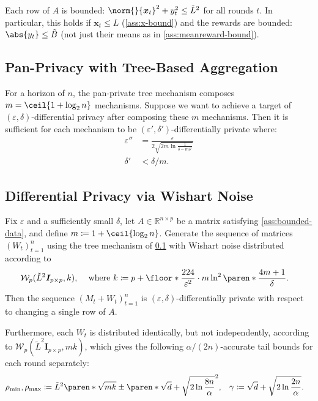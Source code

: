 \documentclass{article}
\renewcommand{\vec}[1]{\bm{#1}}
\newcommand{\defeq}{\coloneq}
\newcommand{\Real}{\mathds{R}}
\DeclarePairedDelimiter{\abs}||
\DeclarePairedDelimiter{\paren}()
\DeclarePairedDelimiter{\floor}\lfloor\rfloor
\DeclarePairedDelimiter{\ceil}\lceil\rceil
\newcommand{\Wishart}{\mathcal{W}}
\newcommand{\Eye}[1]{\bm{I}_{#1 \times #1}}
\begin{document}
\begin{assumption}\label{ass:bounded-data}
  Each row of $A$ is bounded:
  $\norm{}{\vec x_t}^2 + y_t^2 \le \tilde L^2$ for all rounds $t$.  In
  particular, this holds if $\vec x_t \le L$ (\cref{ass:x-bound}) and
  the rewards are bounded: $\abs{y_t} \le \tilde B$ (not just their
  means as in \cref{ass:meanreward-bound}).
\end{assumption}

\subsection{Pan-Privacy with Tree-Based Aggregation}
\label{sec:tree-mechanism}

  For a horizon
of $n$, the pan-private tree mechanism composes $m = \ceil{1+\log_2n}$
mechanisms.  Suppose we want to achieve a target of
$(\varepsilon,\delta)$-differential privacy after composing these $m$
mechanisms.  Then it is sufficient for each mechanism to be
$(\varepsilon',\delta')$-differentially private where:
\begin{align*}
  \varepsilon'' &= \frac{\varepsilon}{2\sqrt{2m\ln\frac{1}{\delta - m\delta'}}} \\
  \delta' &< \delta/m.
\end{align*}

\subsection{Differential Privacy via Wishart Noise}
\label{sec:dp-wishart}

\begin{theorem}%
  \label{thm:wishart-cont-dp}
  Fix $\varepsilon$ and a sufficiently small $\delta$, let
  $A\in\Real^{n\times p}$ be a matrix satisfying
  \cref{ass:bounded-data}, and define $m \defeq 1 + \ceil{\log_2n}$.
  Generate the sequence of matrices $(W_t)_{t=1}^n$ using the tree
  mechanism of \cref{sec:tree-mechanism} with Wishart noise distributed
  according to 
  \begin{align*}
    &\Wishart_p(\tilde L^2\Eye{p}, k),
    &\text{ where } k
    &\defeq p + \floor*{\frac{224}{\varepsilon^2} \cdot m\ln^2\paren*{\frac{4m+1}{\delta}}}.
  \end{align*}
  Then the sequence $(M_t + W_t)_{t=1}^n$ is
  $(\varepsilon,\delta)$-differentially private with respect to
  changing a single row of $A$.

  Furthermore, each $W_t$ is distributed identically, but not
  independently, according to $\Wishart_p(\tilde L^2\Eye{p}, mk)$, which
  gives the following $\alpha/(2n)$-accurate tail bounds for each
  round separately:
  \begin{align*}
    \rho_{\min}, \rho_{\max} &\defeq \tilde L^2 \paren*{\sqrt{mk}
                             \pm \paren*{\sqrt{d} + \sqrt{2\ln\frac{8n}{\alpha}}}}^2,
    &\gamma &\defeq \sqrt{d} + \sqrt{2\ln\frac{2n}{\alpha}}.
  \end{align*}
\end{theorem}
\end{document}
